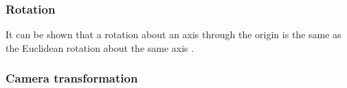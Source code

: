 \subsubsection{Rotation}
It can be shown that a rotation about an axis through the origin is the same as the Euclidean rotation about the same axis \cite{Philips-Mark-Gunn1992}.

\subsubsection{Camera transformation}


